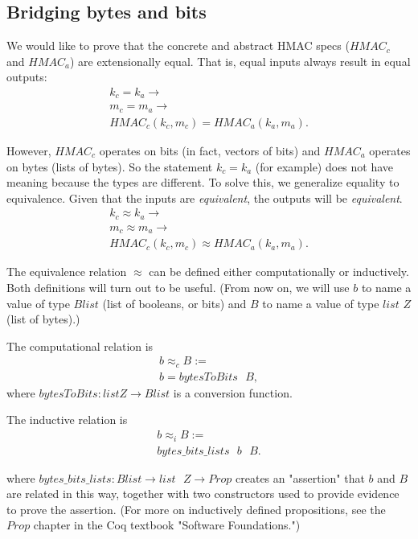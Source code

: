 \documentclass[twocolumn,showpacs,%
  nofootinbib,aps,superscriptaddress,%
  eqsecnum,prd,notitlepage,showkeys,10pt]{revtex4-1}
\begin{document}
\subsection{Bridging bytes and bits}

We would like to prove that the concrete and abstract HMAC specs ($HMAC_c$ and $HMAC_a$) are extensionally equal. That is, equal inputs always result in equal outputs: 
\begin{gather*}
k_c = k_a \rightarrow \\
m_c = m_a \rightarrow \\
HMAC_c(k_c, m_c) = HMAC_a(k_a, m_a).
\end{gather*}

However, $HMAC_c$ operates on bits (in fact, vectors of bits) and $HMAC_a$ operates on bytes (lists of bytes). So the statement $k_c = k_a$ (for example) does not have meaning because the types are different. To solve this, we generalize equality to equivalence. Given that the inputs are {\it equivalent}, the outputs will be {\it equivalent}.
\begin{gather*}
k_c \approx  k_a \rightarrow \\
m_c \approx m_a \rightarrow \\
HMAC_c(k_c, m_c) \approx HMAC_a(k_a, m_a).
\end{gather*}

The equivalence relation $\approx$ can be defined either computationally or inductively. Both definitions will turn out to be useful. (From now on, we will use $b$ to name a value of type $Blist$ (list of booleans, or bits) and $B$ to name a value of type $list$ $Z$ (list of bytes).)

The computational relation is 
\begin{gather*}
b \approx_c B := \\
b = bytesToBits \textrm{ } B,
\end{gather*} where $bytesToBits : list \textrm{} Z \rightarrow Blist$ is a conversion function.

The inductive relation is 
\begin{gather*}
b \approx_i B := \\
bytes\_bits\_lists \textrm{ } b \textrm{ } B.
\end{gather*}

where $bytes\_bits\_lists : Blist \rightarrow list \textrm{ } Z \rightarrow Prop$ creates an "assertion" that $b$ and $B$ are related in this way, together with two constructors used to provide evidence to prove the assertion. (For more on inductively defined propositions, see the $Prop$ chapter in the Coq textbook "Software Foundations.")
\end{document}
